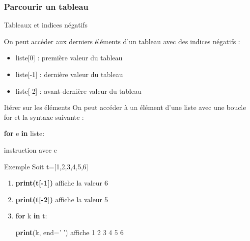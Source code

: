 \documentclass[9pt]{beamer}
\newcounter{num}
\begin{document}
\begin{frame}
\frametitle{Parcourir un tableau}

\begin{block}{Tableaux et indices négatifs}

On peut accéder aux derniers éléments d'un tableau avec des indices négatifs :
\begin{itemize}
\item liste[0] : première valeur du tableau
\item liste[-1] : dernière valeur du tableau
\item liste[-2] : avant-dernière valeur du tableau
\end{itemize}

\end{block}

\begin{block}{Itérer sur les éléments}
On peut accéder à un élément d'une liste avec une boucle for et la syntaxe suivante :

\textbf{for} e \textbf{in} liste:

\hspace{0.5cm}instruction avec e

\end{block}

\begin{exampleblock}{Exemple}
Soit t=[1,2,3,4,5,6]
\begin{enumerate}
\item \textbf{print(t[-1])} affiche la valeur 6
\item \textbf{print(t[-2])} affiche la valeur 5
\item \textbf{for} k \textbf{in} t:

\hspace{0.5cm}\textbf{print}(k, end=' ') affiche 1 2 3 4 5 6
\end{enumerate}

\end{exampleblock}

\end{frame}
\end{document}
